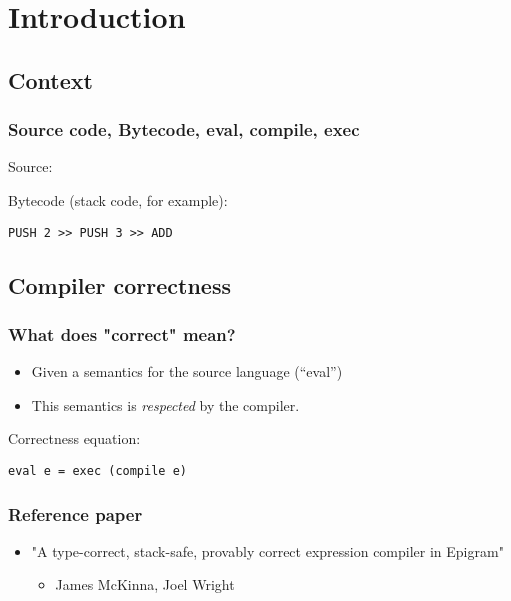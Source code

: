\section{Introduction}

    \subsection{Context}

\begin{frame}[fragile]
            \frametitle{Source code, Bytecode, eval, compile, exec}

            Source:

            Bytecode (stack code, for example):
            \begin{verbatim}
PUSH 2 >> PUSH 3 >> ADD
            \end{verbatim}
\end{frame}


    \subsection{Compiler correctness}
        \begin{frame}[fragile]
            \frametitle{What does "correct" mean?}

            \begin{itemize}
                \item Given a semantics for the source language (``eval'')
                \item This semantics is \emph{respected} by the compiler.
            \end{itemize}

            Correctness equation:
            \begin{verbatim}
eval e = exec (compile e)
            \end{verbatim}
\end{frame}

        \begin{frame}
            \frametitle{Reference paper}
            \begin{itemize}
                \item "A type-correct, stack-safe, provably correct expression compiler in Epigram"
                    \begin{itemize}
                        \item James McKinna, Joel Wright
                    \end{itemize}
            \end{itemize}
        \end{frame}
    

